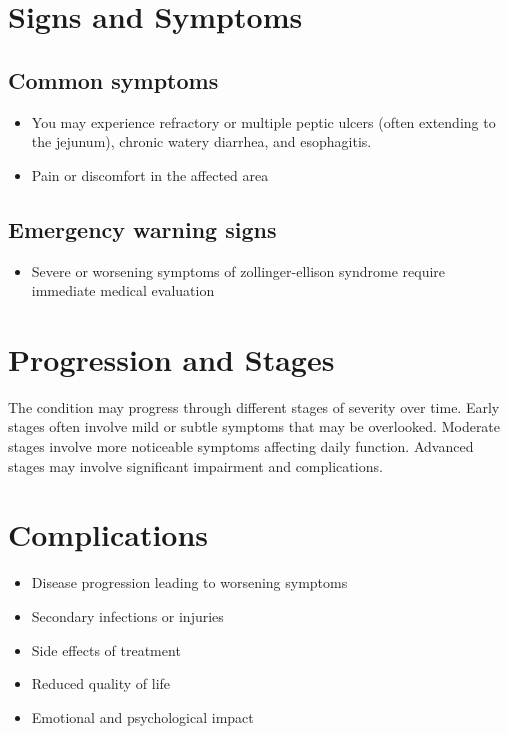 \section{Signs and Symptoms}

\subsection{Common symptoms}
\begin{itemize}[noitemsep]
  \item You may experience refractory or multiple peptic ulcers (often extending to the jejunum), chronic watery diarrhea, and esophagitis.
  \item Pain or discomfort in the affected area
  \end{itemize}

\subsection{Emergency warning signs}
\begin{itemize}[noitemsep]
  \item Severe or worsening symptoms of zollinger-ellison syndrome require immediate medical evaluation
\end{itemize}
\section{Progression and Stages}
The condition may progress through different stages of severity over time. Early stages often involve mild or subtle symptoms that may be overlooked. Moderate stages involve more noticeable symptoms affecting daily function. Advanced stages may involve significant impairment and complications.
\section{Complications}
\begin{itemize}[noitemsep]
  \item Disease progression leading to worsening symptoms
  \item Secondary infections or injuries
  \item Side effects of treatment
  \item Reduced quality of life
  \item Emotional and psychological impact
\end{itemize}
